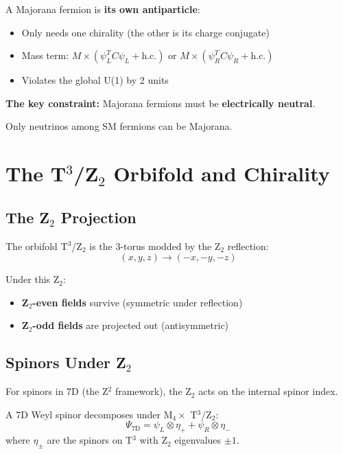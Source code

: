 \documentclass[12pt,a4paper]{article}
\begin{document}
A Majorana fermion is \textbf{its own antiparticle}:
\begin{itemize}
\item Only needs one chirality (the other is its charge conjugate)
\item Mass term: $M \times (\psi^T_L C \psi_L + \text{h.c.})$ or $M \times (\psi^T_R C \psi_R + \text{h.c.})$
\item Violates the global U(1) by 2 units
\end{itemize}

\textbf{The key constraint:} Majorana fermions must be \textbf{electrically neutral}.

Only neutrinos among SM fermions can be Majorana.

\section{The T$^3$/Z$_2$ Orbifold and Chirality}

\subsection{The Z$_2$ Projection}

The orbifold T$^3$/Z$_2$ is the 3-torus modded by the Z$_2$ reflection:
\begin{equation}
(x, y, z) \rightarrow (-x, -y, -z)
\end{equation}

Under this Z$_2$:
\begin{itemize}
\item \textbf{Z$_2$-even fields} survive (symmetric under reflection)
\item \textbf{Z$_2$-odd fields} are projected out (antisymmetric)
\end{itemize}

\subsection{Spinors Under Z$_2$}

For spinors in 7D (the Z$^2$ framework), the Z$_2$ acts on the internal spinor index.

A 7D Weyl spinor decomposes under M$_4 \times$ T$^3$/Z$_2$:
\begin{equation}
\Psi_{\text{7D}} = \psi_L \otimes \eta_+ + \psi_R \otimes \eta_-
\end{equation}
where $\eta_\pm$ are the spinors on T$^3$ with Z$_2$ eigenvalues $\pm 1$.
\end{document}
